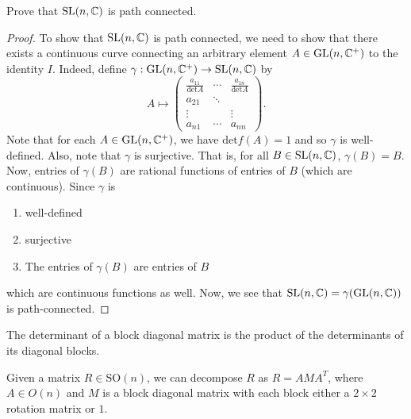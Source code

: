 \documentclass{article}
\begin{document}
\begin{problem}
    Prove that \( \text{SL}(n,\mathbb{C})   \) is path connected.
\end{problem}
\begin{proof}
To show that \( \text{SL}(n,\mathbb{C})   \) is path connected, we need to show that there exists a continuous curve connecting an arbitrary element \( A \in \text{GL}(n,\mathbb{C}^{+})   \) to the identity \( I  \).
    Indeed, define \( \gamma: \text{GL}(n,\mathbb{C}^{+})  \to \text{SL}(n,\mathbb{C})  \) by
    \[  A \longmapsto \begin{pmatrix}  \frac{ {a}_{11} }{ \text{det}A  }  & \cdots & \frac{ {a}_{1n} }{ \text{det}A } \\ {a}_{21} & \ddots &  \\ \vdots  &  \   & \vdots \\ {a}_{n1} & \cdots & {a}_{nn}      \end{pmatrix}.  \]
    Note that for each \( A \in \text{GL}(n,\mathbb{C}^{+})  \), we have \( \text{det}f(A) = 1   \) and so \( \gamma \) is well-defined. Also, note that \( \gamma \) is surjective. That is, for all \( B \in \text{SL}(n,\mathbb{C})  \), \( \gamma(B) = B  \). Now, entries of \( \gamma(B) \) are rational functions of entries of \( B  \) (which are continuous). Since \( \gamma \) is 
    \begin{enumerate}
        \item[(1)] well-defined
        \item[(2)] surjective
        \item[(3)] The entries of \( \gamma(B) \) are entries of \( B  \)
    \end{enumerate}
    which are continuous functions as well. Now, we see that \( \text{SL}(n,\mathbb{C}) = \gamma(\text{GL}(n,\mathbb{C}) )   \) is path-connected.
\end{proof}

\begin{theorem}[ ]
    The determinant of a block diagonal matrix is the product of the determinants of its diagonal blocks.
\end{theorem}

\begin{theorem}[ ]
    Given a matrix \( R \in \text{SO}(n)  \), we can decompose \( R  \) as \( R = A M A^{T} \), where \( A \in O(n) \) and \( M  \) is a block diagonal matrix with each block either a \( 2 \times 2  \) rotation matrix or \( 1 \). 
\end{theorem}
\end{document}
